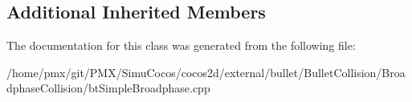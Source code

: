\subsection*{Additional Inherited Members}


The documentation for this class was generated from the following file\+:\begin{DoxyCompactItemize}
\item 
/home/pmx/git/\+P\+M\+X/\+Simu\+Cocos/cocos2d/external/bullet/\+Bullet\+Collision/\+Broadphase\+Collision/bt\+Simple\+Broadphase.\+cpp\end{DoxyCompactItemize}

